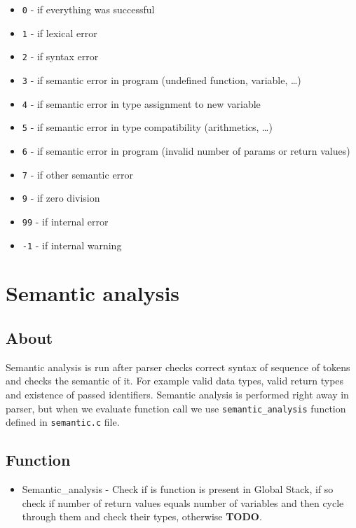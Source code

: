 \documentclass[11pt, titlepage]{article}
\begin{document}
\begin{itemize}[itemsep=-5pt]
\item
  \texttt{0} - if everything was successful
\item
  \texttt{1} - if lexical error
\item
  \texttt{2} - if syntax error
\item
  \texttt{3} - if semantic error in program (undefined function,
  variable, \ldots)
\item
  \texttt{4} - if semantic error in type assignment to new variable
\item
  \texttt{5} - if semantic error in type compatibility (arithmetics,
  \ldots)
\item
  \texttt{6} - if semantic error in program (invalid number of params or
  return values)
\item
  \texttt{7} - if other semantic error
\item
  \texttt{9} - if zero division
\item
  \texttt{99} - if internal error
\item
  \texttt{-1} - if internal warning
\end{itemize}



\section{Semantic analysis}\label{semantic-analysis}

\subsection{About}\label{about-2}

Semantic analysis is run after parser checks correct
syntax of sequence of tokens and checks the semantic of it. For example
valid data types, valid return types and existence of passed
identifiers. Semantic analysis is performed right away in parser, but when we evaluate function call we use \texttt{semantic\_analysis} function defined in \texttt{semantic.c} file.
\subsection{Function}\label{function_sym}
\begin{itemize}
\item Semantic\_analysis - Check if is function is present in Global Stack, if so check if number of return values equals number of variables and then cycle through them and check their types, otherwise \textbf{TODO}.
\end{itemize}
\end{document}
